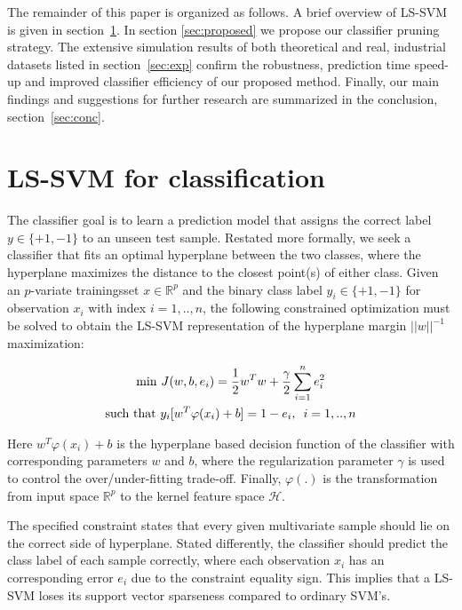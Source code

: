 \documentclass[preprint,12pt]{elsarticle}
\begin{document}
	The remainder of this paper is organized as follows. A brief overview of LS-SVM is given in section~\ref{sec:lssvm}. In section \ref{sec:proposed} we propose our classifier pruning strategy. The extensive simulation results of both theoretical and real, industrial datasets listed in section~\ref{sec:exp} confirm the robustness, prediction time speed-up and improved classifier efficiency of our proposed method. Finally, our main findings and suggestions for further research are summarized in the conclusion, section~\ref{sec:conc}. 
	
	
	\section{LS-SVM for classification}
	\label{sec:lssvm}
	The classifier goal is to learn a prediction model that assigns the correct label $y \in \{+1, -1\}$ to an unseen test sample. Restated more formally, we seek a classifier that fits an optimal hyperplane between the two classes, where the hyperplane maximizes the distance to the closest point(s) of either class. 
	Given an $p$-variate trainingsset $x \in \mathbb{R}^p$ and the binary class label $y_i \in \{+1,-1\}$ for observation $x_i$ with index $i = 1,..,n$, the following constrained optimization must be solved to obtain the LS-SVM representation of the hyperplane margin $||w||^{-1}$ maximization:
	
	\begin{gather}
	\label{eq:costfunction}
	\mathrm{min} \  J(w,b,e_i) = \frac{1}{2} w^T w + \frac{\gamma}{2} \sum_{i=1}^{n} e_i^2 \\
	\label{eq:lsconstraint}
	\textrm{such that } y_i[w^T \varphi(x_i) + b] = 1-e_i, \enskip i = 1,..,n
	\end{gather}
	
	Here $w^T \varphi(x_i) + b$ is the hyperplane based decision function of the classifier with corresponding parameters $w$ and $b$, where the regularization parameter $\gamma$ is used to control the over/under-fitting trade-off. Finally,  $\varphi(.)$ is the transformation from input space $\mathbb{R}^p$ to the kernel feature space $\mathcal{H}$. 
	
	The specified constraint states that every given multivariate sample should lie on the correct side of hyperplane. Stated differently, the classifier should predict the class label of each sample correctly, where each observation $x_i$ has an corresponding error $e_i$ due to the constraint equality sign. This implies that a LS-SVM loses its support vector sparseness compared to ordinary SVM's. \\
	
\end{document}
